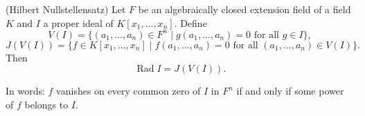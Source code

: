 (Hilbert Nullstellensatz) Let $F$ be an algebraically closed extension field of a field $K$ and $I$ a proper ideal of $K[x_1, \ldots, x_n]$. Define
\[
V(I) = \{(a_1, \ldots, a_n) \in F^n \mid g(a_1, \ldots, a_n) = 0 \text{ for all } g \in I\},
\]
\[
J(V(I)) = \{f \in K[x_1, \ldots, x_n] \mid f(a_1, \ldots, a_n) = 0 \text{ for all } (a_1, \ldots, a_n) \in V(I)\}.
\]
Then
\[
\operatorname{Rad} I = J(V(I)).
\]

In words: $f$ vanishes on every common zero of $I$ in $F^n$ if and only if some power of $f$ belongs to $I$.

